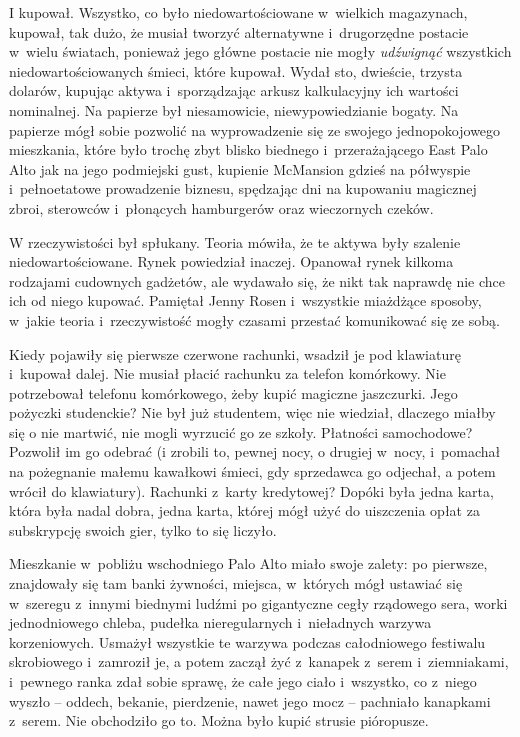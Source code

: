 \documentclass[oneside,polish,11pt,rmheadings]{mwbk}
\begin{document}
I kupował. Wszystko, co było niedowartościowane w~wielkich magazynach, kupował, tak dużo, że musiał tworzyć alternatywne i~drugorzędne postacie w~wielu światach, ponieważ jego główne postacie nie mogły \textit{udźwignąć }wszystkich niedowartościowanych śmieci, które kupował. Wydał sto, dwieście, trzysta dolarów, kupując aktywa i~sporządzając arkusz kalkulacyjny ich wartości nominalnej. Na papierze był niesamowicie, niewypowiedzianie bogaty. Na papierze mógł sobie pozwolić na wyprowadzenie się ze swojego jednopokojowego mieszkania, które było trochę zbyt blisko biednego i~przerażającego East Palo Alto jak na jego podmiejski gust, kupienie McMansion gdzieś na półwyspie i~pełnoetatowe prowadzenie biznesu, spędzając dni na kupowaniu magicznej zbroi, sterowców i~płonących hamburgerów oraz wieczornych czeków.

W rzeczywistości był spłukany. Teoria mówiła, że te aktywa były szalenie niedowartościowane. Rynek powiedział inaczej. Opanował rynek kilkoma rodzajami cudownych gadżetów, ale wydawało się, że nikt tak naprawdę nie chce ich od niego kupować. Pamiętał Jenny Rosen i~wszystkie miażdżące sposoby, w~jakie teoria i~rzeczywistość mogły czasami przestać komunikować się ze sobą.

Kiedy pojawiły się pierwsze czerwone rachunki, wsadził je pod klawiaturę i~kupował dalej. Nie musiał płacić rachunku za telefon komórkowy. Nie potrzebował telefonu komórkowego, żeby kupić magiczne jaszczurki. Jego pożyczki studenckie? Nie był już studentem, więc nie wiedział, dlaczego miałby się o nie martwić, nie mogli wyrzucić go ze szkoły. Płatności samochodowe? Pozwolił im go odebrać (i zrobili to, pewnej nocy, o drugiej w~nocy, i~pomachał na pożegnanie małemu kawałkowi śmieci, gdy sprzedawca go odjechał, a potem wrócił do klawiatury). Rachunki z~karty kredytowej? Dopóki była jedna karta, która była nadal dobra, jedna karta, której mógł użyć do uiszczenia opłat za subskrypcję swoich gier, tylko to się liczyło.

Mieszkanie w~pobliżu wschodniego Palo Alto miało swoje zalety: po pierwsze, znajdowały się tam banki żywności, miejsca, w~których mógł ustawiać się w~szeregu z~innymi biednymi ludźmi po gigantyczne cegły rządowego sera, worki jednodniowego chleba, pudełka nieregularnych i~nieładnych warzywa korzeniowych. Usmażył wszystkie te warzywa podczas całodniowego festiwalu skrobiowego i~zamroził je, a potem zaczął żyć z~kanapek z~serem i~ziemniakami, i~pewnego ranka zdał sobie sprawę, że całe jego ciało i~wszystko, co z~niego wyszło -- oddech, bekanie, pierdzenie, nawet jego mocz -- pachniało kanapkami z~serem. Nie obchodziło go to. Można było kupić strusie pióropusze.
\end{document}
